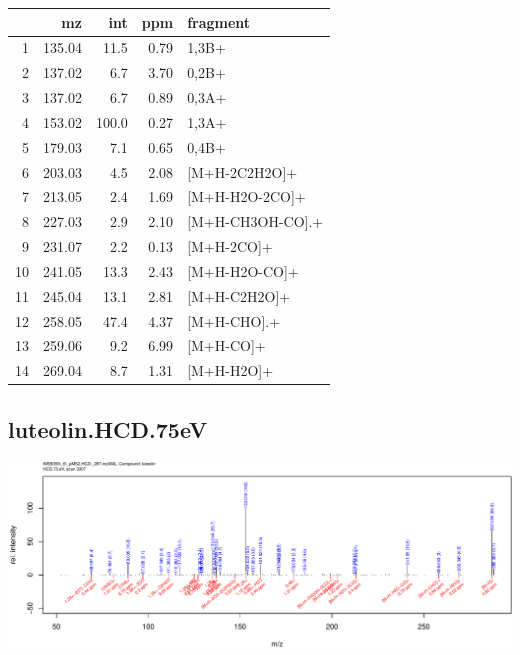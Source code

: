 \documentclass[]{article}
\begin{document}
\begin{table}[ht]
\centering
\begin{tabular}{rrrrl}
  \toprule
 & mz & int & ppm & fragment \\ 
  \midrule
1 & 135.04 & 11.5 & 0.79 & 1,3B+ \\ 
  2 & 137.02 & 6.7 & 3.70 & 0,2B+ \\ 
  3 & 137.02 & 6.7 & 0.89 & 0,3A+ \\ 
  4 & 153.02 & 100.0 & 0.27 & 1,3A+ \\ 
  5 & 179.03 & 7.1 & 0.65 & 0,4B+ \\ 
  6 & 203.03 & 4.5 & 2.08 & [M+H-2C2H2O]+ \\ 
  7 & 213.05 & 2.4 & 1.69 & [M+H-H2O-2CO]+ \\ 
  8 & 227.03 & 2.9 & 2.10 & [M+H-CH3OH-CO].+ \\ 
  9 & 231.07 & 2.2 & 0.13 & [M+H-2CO]+ \\ 
  10 & 241.05 & 13.3 & 2.43 & [M+H-H2O-CO]+ \\ 
  11 & 245.04 & 13.1 & 2.81 & [M+H-C2H2O]+ \\ 
  12 & 258.05 & 47.4 & 4.37 & [M+H-CHO].+ \\ 
  13 & 259.06 & 9.2 & 6.99 & [M+H-CO]+ \\ 
  14 & 269.04 & 8.7 & 1.31 & [M+H-H2O]+ \\ 
   \bottomrule
\end{tabular}
\end{table}

\clearpage\subsection{luteolin.HCD.75eV}
\includegraphics[width=\textwidth]{WEB350_files/figure-latex/unnamed-chunk-3-17}
\end{document}
